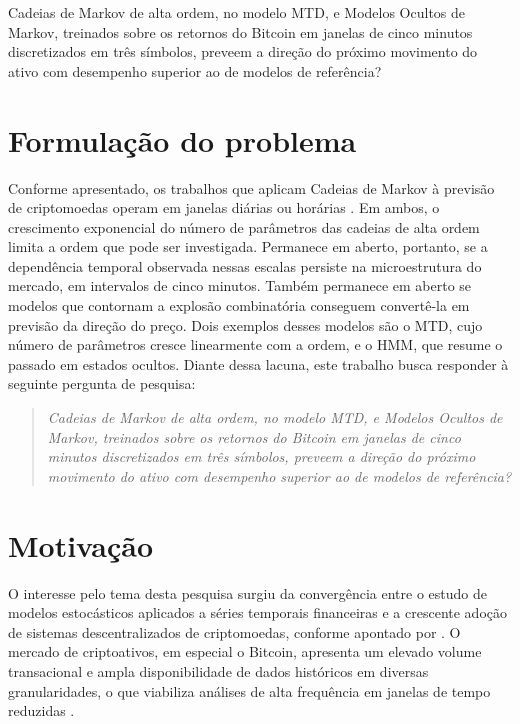 \documentclass[
    12pt,                %
    openright,           %
    oneside,             %
    a4paper,             %
    english,             %
    brazil               %
]{abntex2}
\begin{document}
Cadeias de Markov de alta ordem, no modelo MTD, e Modelos Ocultos de Markov, treinados sobre os retornos do Bitcoin em janelas de cinco minutos discretizados em três símbolos, preveem a direção do próximo movimento do ativo com desempenho superior ao de modelos de referência?

\section{Formulação do problema}
\label{sec:problema}

Conforme apresentado, os trabalhos que aplicam Cadeias de Markov à previsão de criptomoedas operam em 
janelas diárias \cite{NASCIMENTO} ou horárias \cite{ARAUJO}. Em ambos, o crescimento exponencial do número de parâmetros das 
cadeias de alta ordem limita a ordem que pode ser investigada. Permanece em aberto, portanto, se a dependência temporal 
observada nessas escalas persiste na microestrutura do mercado, em intervalos de cinco minutos. Também permanece em 
aberto se modelos que contornam a explosão combinatória conseguem convertê-la em previsão da direção do preço. 
Dois exemplos desses modelos são o MTD, cujo número de parâmetros cresce linearmente com a ordem, e o HMM, que resume o 
passado em estados ocultos.
Diante dessa lacuna, este trabalho busca responder à seguinte pergunta de pesquisa:


\begin{quote}
\textit{Cadeias de Markov de alta ordem, no modelo MTD, e Modelos Ocultos de Markov, treinados sobre os 
retornos do Bitcoin em janelas de cinco minutos discretizados em três símbolos, preveem a direção do próximo 
movimento do ativo com desempenho superior ao de modelos de referência?}
\end{quote}


\section{Motivação}

O interesse pelo tema desta pesquisa surgiu da convergência entre o estudo de modelos estocásticos aplicados a séries temporais financeiras e a crescente adoção de sistemas descentralizados de criptomoedas, conforme apontado por . O mercado de criptoativos, em especial o Bitcoin, apresenta um elevado volume transacional e ampla disponibilidade de dados históricos em diversas granularidades, o que viabiliza análises de alta frequência em janelas de tempo reduzidas \cite{catania2019bitcoin}.
\end{document}
